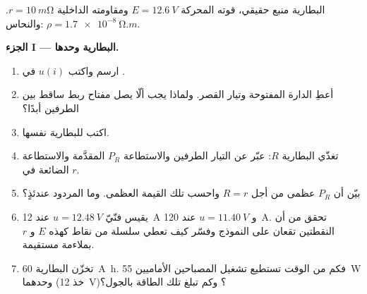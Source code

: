 \begin{problem}
\label{pb:b1:dc-circuits:1}
البطارية منبع حقيقي، قوته المحركة $E = \qty{12.6}{V}$ ومقاومته
الداخلية $r = \qty{10}{m\ohm}$. والنحاس: $\rho = \qty{1.7e-8}{\ohm.m}$.

\medskip
\noindent\textbf{الجزء I --- البطارية وحدها.}
\begin{enumerate}
  \item ارسم  واكتب $u(i)$ في .
  \item أعطِ  الدارة المفتوحة وتيار القصر.
        ولماذا يجب ألّا يصل مفتاح ربط ساقط بين الطرفين أبدًا؟
  \item اكتب  للبطارية نفسها.
  \item تغذّي البطارية  $R$: عبّر عن التيار 
        الطرفين والاستطاعة $P_R$ المقدَّمة والاستطاعة الضائعة
        في $r$.
  \item بيّن أن $P_R$ عظمى من أجل $R = r$ واحسب تلك
        القيمة العظمى. وما المردود عندئذٍ؟
  \item يقيس فنّيّ $u = \qty{12.48}{V}$ عند \qty{12}{A} و
        $u = \qty{11.40}{V}$ عند \qty{120}{A}. تحقق من أن النقطتين تقعان
        على النموذج وفسّر كيف تعطي سلسلة من نقاط كهذه $E$
        و $r$ بملاءمة مستقيمة.
  \item تخزّن البطارية \qty{60}{A.h}. فكم من الوقت تستطيع تشغيل
        المصباحين الأماميين \qty{55}{W} وحدهما (خذ \qty{12}{V})؟ وكم تبلغ
        تلك الطاقة بالجول؟
\end{enumerate}


\end{problem}
